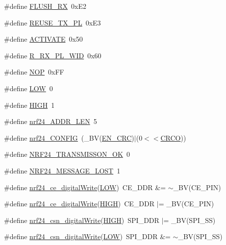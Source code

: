 \begin{DoxyCompactItemize}
\item 
\#define \hyperlink{a00013_ab2418a6171d7f1eefd458927fdfe7057}{F\-L\-U\-S\-H\-\_\-\-R\-X}~0x\-E2
\item 
\#define \hyperlink{a00013_a2f1d9bb858232e8b1494b60aa9a7d25a}{R\-E\-U\-S\-E\-\_\-\-T\-X\-\_\-\-P\-L}~0x\-E3
\item 
\#define \hyperlink{a00013_ad37ed8e28abe573e992766b0e3b0353b}{A\-C\-T\-I\-V\-A\-T\-E}~0x50
\item 
\#define \hyperlink{a00013_a14ea186f093047db160cee642e5bd901}{R\-\_\-\-R\-X\-\_\-\-P\-L\-\_\-\-W\-I\-D}~0x60
\item 
\#define \hyperlink{a00013_a700f88377bf36711b711f69b06c52f5d}{N\-O\-P}~0x\-F\-F
\item 
\#define \hyperlink{a00013_ab811d8c6ff3a505312d3276590444289}{L\-O\-W}~0
\item 
\#define \hyperlink{a00013_a5bb885982ff66a2e0a0a45a8ee9c35e2}{H\-I\-G\-H}~1
\item 
\#define \hyperlink{a00013_a0fc7aaa69be3826e71c43e29799bcc16}{nrf24\-\_\-\-A\-D\-D\-R\-\_\-\-L\-E\-N}~5
\item 
\#define \hyperlink{a00013_acd40fcae97af82e5847c656c3fc0c680}{nrf24\-\_\-\-C\-O\-N\-F\-I\-G}~(\-\_\-\-B\-V(\hyperlink{a00013_aece57618cf42f6b1b520341ef19a66f8}{E\-N\-\_\-\-C\-R\-C})$\vert$(0$<$$<$\hyperlink{a00013_a253dd73b17f0ea7f71e55f52e796836a}{C\-R\-C\-O}))
\item 
\#define \hyperlink{a00013_a69a54ec3530107a778c9861270919909}{N\-R\-F24\-\_\-\-T\-R\-A\-N\-S\-M\-I\-S\-S\-O\-N\-\_\-\-O\-K}~0
\item 
\#define \hyperlink{a00013_a5000cc60453dababe03360120a372261}{N\-R\-F24\-\_\-\-M\-E\-S\-S\-A\-G\-E\-\_\-\-L\-O\-S\-T}~1
\item 
\#define \hyperlink{a00013_af9d653f495e45003d36d77eb47d34e8f}{nrf24\-\_\-ce\-\_\-digital\-Write}(\hyperlink{a00013_ab811d8c6ff3a505312d3276590444289}{L\-O\-W})~C\-E\-\_\-\-D\-D\-R \&= $\sim$\-\_\-\-B\-V(C\-E\-\_\-\-P\-I\-N)
\item 
\#define \hyperlink{a00013_aafbec88c73d8df18b354cb0c178c85d4}{nrf24\-\_\-ce\-\_\-digital\-Write}(\hyperlink{a00013_a5bb885982ff66a2e0a0a45a8ee9c35e2}{H\-I\-G\-H})~C\-E\-\_\-\-D\-D\-R $\vert$= \-\_\-\-B\-V(C\-E\-\_\-\-P\-I\-N)
\item 
\#define \hyperlink{a00013_a72e4c99006466efef3f24a971ff91370}{nrf24\-\_\-csn\-\_\-digital\-Write}(\hyperlink{a00013_a5bb885982ff66a2e0a0a45a8ee9c35e2}{H\-I\-G\-H})~S\-P\-I\-\_\-\-D\-D\-R $\vert$= \-\_\-\-B\-V(S\-P\-I\-\_\-\-S\-S)
\item 
\#define \hyperlink{a00013_ae384d7d9d13b3911c84e358e59da5a9e}{nrf24\-\_\-csn\-\_\-digital\-Write}(\hyperlink{a00013_ab811d8c6ff3a505312d3276590444289}{L\-O\-W})~S\-P\-I\-\_\-\-D\-D\-R \&= $\sim$\-\_\-\-B\-V(S\-P\-I\-\_\-\-S\-S)
\end{DoxyCompactItemize}
